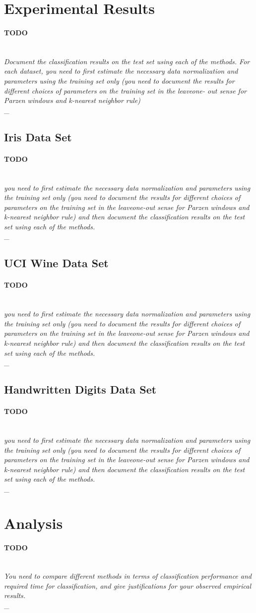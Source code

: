 \documentclass{article}
\newcommand{\outline}[2]{\paragraph{\textsc{#1}}\hrulefill~\\{\small\it #2}\\\_\hrulefill~\\}
\newcommand{\todo}[1]{\outline{\large TODO}{#1}}
\begin{document}
\section{Experimental Results}
\todo{Document the classification results on the test set using each of the methods. For each dataset, you need to first estimate the necessary data normalization and parameters using the training set only (you need to document the results for different choices of parameters on the training set in the leaveone- out sense for Parzen windows and k-nearest neighbor rule)}

\subsection{Iris Data Set}
\todo{you need to first estimate the necessary data normalization and parameters using the training set only (you need to document the results for different choices of parameters on the training set in the leaveone-out sense for Parzen windows and k-nearest neighbor rule) and then document the classification results on
the test set using each of the methods.}

\subsection{UCI Wine Data Set}
\todo{you need to first estimate the necessary data normalization and parameters using the training set only (you need to document the results for different choices of parameters on the training set in the leaveone-out sense for Parzen windows and k-nearest neighbor rule) and then document the classification results on
the test set using each of the methods.}

\subsection{Handwritten Digits Data Set}
\todo{you need to first estimate the necessary data normalization and parameters using the training set only (you need to document the results for different choices of parameters on the training set in the leaveone-out sense for Parzen windows and k-nearest neighbor rule) and then document the classification results on
the test set using each of the methods.}

\section{Analysis}
\todo{You need to compare different methods in terms of classification performance and required time for classification, and give justifications for your observed empirical results.}
\end{document}
